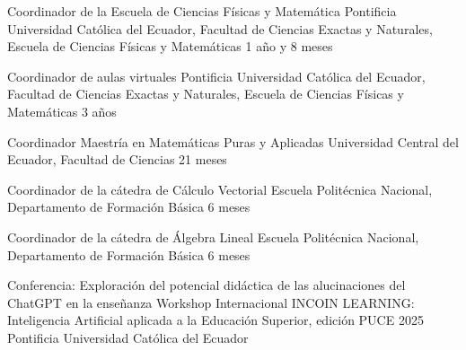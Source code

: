 \documentclass[
	a4paper,
	maincolor=cvblue!70!blue,
	sidecolor=gray!30,
	sectioncolor=cvblue!70!blue,
    sidebarwidth=7.5cm,
	topbottommargin=20pt,
	leftrightmargin=20pt,
]{fortysecondscv}
\begin{document}

    {Coordinador de la Escuela de Ciencias Físicas y Matemática}
    {Pontificia Universidad Católica del Ecuador, Facultad de Ciencias Exactas y Naturales, Escuela de Ciencias Físicas y Matemáticas}
    {1 año y 8 meses}
    
    {Coordinador de aulas virtuales}
    {Pontificia Universidad Católica del Ecuador, Facultad de Ciencias Exactas y Naturales, Escuela de Ciencias Físicas y Matemáticas}
    {3 años}
    
    {Coordinador Maestría en Matemáticas Puras y Aplicadas}
    {Universidad Central del Ecuador, Facultad de Ciencias}
    {21 meses}
    
    {Coordinador de la cátedra de Cálculo Vectorial}
    {Escuela Politécnica Nacional, Departamento de Formación Básica}
    {6 meses}
    
    {Coordinador de la cátedra de Álgebra Lineal}
    {Escuela Politécnica Nacional, Departamento de Formación Básica}
    {6 meses}
    



\newpage
{}



    {Conferencia: Exploración del potencial didáctica de las alucinaciones del ChatGPT en la enseñanza}
    {Workshop Internacional INCOIN LEARNING: Inteligencia Artificial aplicada a la Educación Superior, edición PUCE 2025}
    {Pontificia Universidad Católica del Ecuador}
    
\end{document}
